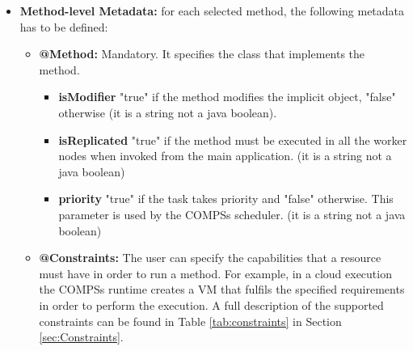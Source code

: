 \begin{itemize}
 \item {\bf Method-level Metadata:} for each selected method, the following metadata has to be defined:
       \begin{itemize}
         \item {\bf @Method:} Mandatory. It specifies the class that implements the method.
		\begin{itemize}
			\item \textbf{isModifier} "true" if the method modifies the implicit object, "false" otherwise (it is a string not a java boolean).
			\item \textbf{isReplicated} "true" if the method must be executed in all the worker nodes when invoked from the main application. (it is a string not a java boolean)
			\item \textbf{priority} "true" if the task takes priority and "false" otherwise. This parameter is used by the COMPSs scheduler. (it is a string not a java boolean)
		\end{itemize}
         \item {\bf @Constraints:} The user can specify the capabilities that a resource must have in order
               to run a method. For example, in a cloud execution the COMPSs runtime creates a VM that fulfils the
               specified requirements in order to perform the execution. A full description of the supported constraints
               can be found in Table \ref{tab:constraints} in Section \ref{sec:Constraints}.
       \end{itemize}


\end{itemize}
